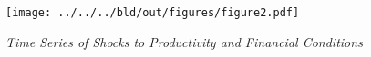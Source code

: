 \begin{figure}[h]
  \centering
  \texttt{[image: ../../../bld/out/figures/figure2.pdf]}
  \caption{\textit{Time Series of Shocks to Productivity and Financial Conditions}}
  \label{fig:figure1_update}
\end{figure}
